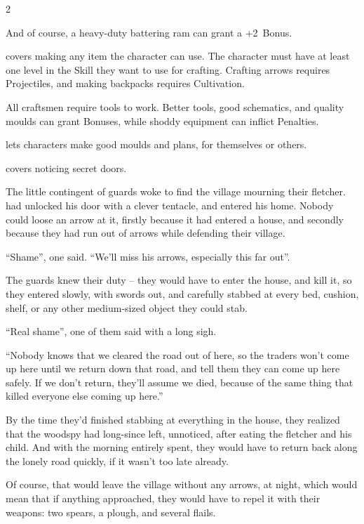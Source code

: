 \begin{multicols}{2}
\begin{description}
    And of course, a heavy-duty battering ram can grant a +2~Bonus.
  \item[\roll{Dexterity}{Crafts}]
    covers making any item the character can use.
    The character must have at least one level in the Skill they want to use for crafting.
    Crafting arrows requires Projectiles, and making backpacks requires Cultivation.

    All craftsmen require tools to work.
    Better tools, good schematics, and quality moulds can grant Bonuses, while shoddy equipment can inflict Penalties.
  \item[\roll{Intelligence}{Crafts}]
    lets characters make good moulds and plans, for themselves or others.
  \item[\roll{Wits}{Crafts}]
    covers noticing secret doors.
\end{description}

\begin{exampletext}
  The little contingent of \glspl{guard} woke to find the \gls{village} mourning their fletcher.
   had unlocked his door with a clever tentacle, and entered his home.
  Nobody could loose an arrow at it, firstly because it had entered a house, and secondly because they had run out of arrows while defending their \gls{village}.

  ``Shame'', one said.
  ``We'll miss his arrows, especially this far out''.

  The \glspl{guard} knew their duty -- they would have to enter the house, and kill it, so they entered slowly, with swords out, and carefully stabbed at every bed, cushion, shelf, or any other medium-sized object they could stab.

  ``Real shame'', one of them said with a long sigh.

  ``Nobody knows that we cleared the road out of here, so the traders won't come up here until we return down that road, and tell them they can come up here safely.
  If we don't return, they'll assume we died, because of the same thing that killed everyone else coming up here.''

  By the time they'd finished stabbing at everything in the house, they realized that the \gls{woodspy} had long-since left, unnoticed, after eating the fletcher and his child.
  And with the morning entirely spent, they would have to return back along the lonely road quickly, if it wasn't too late already.

  Of course, that would leave the \gls{village} without any arrows, at night, which would mean that if anything approached, they would have to repel it with their weapons: two spears, a plough, and several flails.


\end{exampletext}
\end{multicols}
